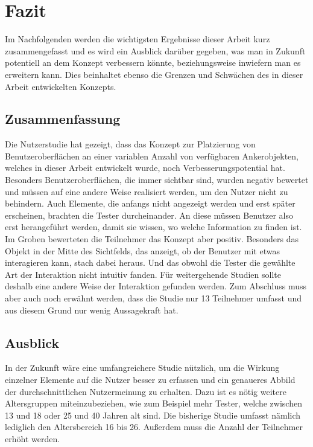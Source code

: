 
\chapter{Fazit}\label{chapter:conclusion}

	Im Nachfolgenden werden die wichtigsten Ergebnisse dieser Arbeit kurz zusammengefasst und es wird ein Ausblick darüber gegeben, was man in Zukunft potentiell an dem Konzept verbessern könnte, beziehungsweise inwiefern man es erweitern kann. Dies beinhaltet ebenso die Grenzen und Schwächen des in dieser Arbeit entwickelten Konzepts.

	\section{Zusammenfassung}
	
		Die Nutzerstudie hat gezeigt, dass das Konzept zur Platzierung von Benutzeroberflächen an einer variablen Anzahl von verfügbaren Ankerobjekten, welches in dieser Arbeit entwickelt wurde, noch Verbesserungspotential hat.
		Besonders Benutzeroberflächen, die immer sichtbar sind, wurden negativ bewertet und müssen auf eine andere Weise realisiert werden, um den Nutzer nicht zu behindern.
		Auch Elemente, die anfangs nicht angezeigt werden und erst später erscheinen, brachten die Tester durcheinander. An diese müssen Benutzer also erst herangeführt werden, damit sie wissen, wo welche Information zu finden ist.
		Im Groben bewerteten die Teilnehmer das Konzept aber positiv.
		Besonders das Objekt in der Mitte des Sichtfelds, das anzeigt, ob der Benutzer mit etwas interagieren kann, stach dabei heraus. Und das obwohl die Tester die gewählte Art der Interaktion nicht intuitiv fanden.
		Für weitergehende Studien sollte deshalb eine andere Weise der Interaktion gefunden werden.
		Zum Abschluss muss aber auch noch erwähnt werden, dass die Studie nur 13 Teilnehmer umfasst und aus diesem Grund nur wenig Aussagekraft hat.
		
	
	\section{Ausblick}
		
		In der Zukunft wäre eine umfangreichere Studie nützlich, um die Wirkung einzelner Elemente auf die Nutzer besser zu erfassen und ein genaueres Abbild der durchschnittlichen Nutzermeinung zu erhalten. Dazu ist es nötig weitere Altersgruppen miteinzubeziehen, wie zum Beispiel mehr Tester, welche zwischen 13 und 18 oder 25 und 40 Jahren alt sind. Die bisherige Studie umfasst nämlich lediglich den Altersbereich 16 bis 26. Außerdem muss die Anzahl der Teilnehmer erhöht werden.
		
